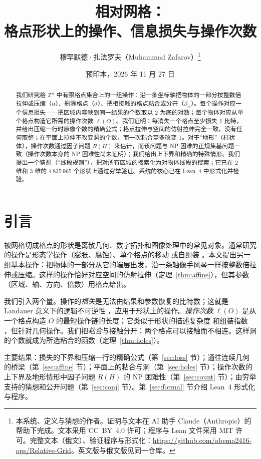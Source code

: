 \documentclass[11pt,a4paper]{article}
\title{\textbf{相对网格：\\ 格点形状上的操作、信息损失与操作次数}}
\author{穆罕默德·扎法罗夫（Muhammad Zafarov）\thanks{本系统、定义与猜想的作者。证明与文本在 AI 助手 Claude（Anthropic）的帮助下完成。文本采用 CC~BY~4.0 许可；程序与 Lean 文件采用 MIT 许可。完整文本（俄文）、验证程序与形式化：\url{https://github.com/abema2416-ops/Relative-Grid}。英文版与俄文版见同一仓库。}}
\date{预印本，2026 年 11 月 27 日}
\theoremstyle{plain}
\theoremstyle{definition}
\theoremstyle{remark}
\newcommand{\Z}{\mathbb{Z}}
\begin{document}
\maketitle

\begin{abstract}
我们研究格 $\Z^n$ 中有限格点集合上的一组操作：沿一条坐标轴把物体的一部分按整数倍拉伸或压缩（$\alpha$）、删除格点（$\sigma$）、把相接触的格点粘合或分开（$\beta_\pm$）。每个操作对应一个信息损失——把区域内容映到同一结果的个数取以 2 为底的对数；每个物体对应从单个格点构造它所需的操作次数 $\ell(O)$。我们证明：每消失一个格点至少损失 1 比特，并给出压缩一行时原像个数的精确公式；格点拉伸与空间的仿射拉伸完全一致，没有任何取整；在平面上拉伸不改变洞的个数，而一次粘合至多改变 1。对于“地形”（柱状体），操作次数通过因子问题 $R(H)$ 来估计，而该问题与 NP 困难的正规集基问题一致（操作次数本身的 NP 困难性尚未证明）；我们给出上下界和精确的特殊情形。我们提出一个猜想（“线段规则”），把对所有区域的搜索化为对物体线段的搜索；它已在 2 维和 3 维的 $4\,835\,965$ 个形状上通过穷举验证。系统的核心已在 Lean~4 中形式化并检验。
\end{abstract}

\section{引言}

被网格切成格点的形状是离散几何、数字拓扑和图像处理中的常见对象。通常研究的操作是形态学操作（膨胀、腐蚀）\cite{serra}、单个格点的移动 \cite{akitaya} 或自组装 \cite{soloveichik}。本文提出另一组基本操作：把物体的一部分从它的端层出发，沿一条轴像手风琴一样按整数倍拉伸或压缩。这样的操作恰好对应空间的仿射拉伸（定理~\ref{thm:affine}），但其参数（区域、轴、方向、倍数）用格点给出。

我们引入两个量。操作的\emph{损失}是无法由结果和参数恢复的比特数；这就是 Landauer 意义下的逻辑不可逆性 \cite{landauer}，应用于形状上的操作。\emph{操作次数} $\ell(O)$ 是从一个格点构造 $O$ 的最短操作链的长度；它类似于形状的描述复杂度 \cite{soloveichik} 和组装指数 \cite{assembly}，但针对几何操作。我们把\emph{粘合}与接触分开：两个格点可以接触而不相连。这样洞的个数就成为所选粘合的函数（定理~\ref{thm:holes}）。

主要结果：损失的下界和压缩一行的精确公式（第~\ref{sec:loss} 节）；通往连续几何的桥梁（第~\ref{sec:affine} 节）；平面上的粘合与洞（第~\ref{sec:holes} 节）；操作次数的上下界及地形情形中因子问题 $R(H)$ 的 NP 困难性（第~\ref{sec:count} 节）；由穷举支持的猜想和公开问题（第~\ref{sec:conj} 节）。第~\ref{sec:formal} 节介绍 Lean~4 形式化与程序。
\end{document}
